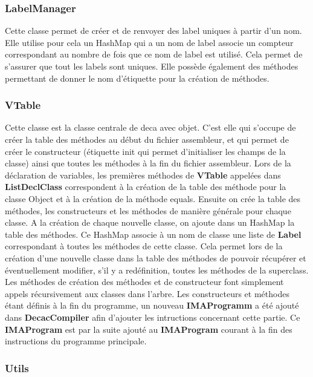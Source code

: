 \documentclass[12pt, a4paper, one side]{article}
\begin{document}
    \subsubsection{LabelManager}

    Cette classe permet de créer et de renvoyer des label uniques à partir d'un
    nom. Elle utilise pour cela un HashMap
    qui a un nom de label associe un compteur correspondant au nombre de fois
    que ce nom de label est utilisé. Cela
    permet de s'assurer que tout les labels sont uniques. Elle possède également
    des méthodes permettant de donner le nom d'étiquette pour la création
    de méthodes.

    \subsubsection{VTable}

    Cette classe est la classe centrale de deca avec objet. C'est elle qui
    s'occupe de créer la table des méthodes au début du fichier assembleur,
    et qui permet de créer le constructeur (étiquette init qui permet
    d'initialiser les champs de la classe) ainsi que toutes les méthodes
    à la fin du fichier assembleur.
    Lors de la déclaration de variables, les premières méthodes de
    \textbf{VTable} appelées dans \textbf{ListDeclClass} correspondent à
    la création de la table des méthode pour la classe Object et à la création
    de la méthode equals. Ensuite on crée la table des méthodes, les
    constructeurs et les méthodes de manière générale pour chaque classe.
    A la création de chaque nouvelle classe, on ajoute dans un HashMap la table
    des méthodes. Ce HashMap associe à un nom de classe une liste de
    \textbf{Label} correspondant à toutes les méthodes de cette classe. Cela
    permet lors de la création d'une nouvelle classe dans la table des méthodes
    de pouvoir récupérer et éventuellement modifier, s'il y a redéfinition, toutes
    les méthodes de la superclass. Les méthodes de création des méthodes et
    de constructeur font simplement appels récursivement aux classes dans
    l'arbre. Les constructeurs et méthodes étant définis à la fin du programme,
    un nouveau \textbf{IMAProgramm} a été ajouté dans \textbf{DecacCompiler}
    afin d'ajouter les intructions concernant cette partie. Ce
    \textbf{IMAProgram} est par la suite ajouté au \textbf{IMAProgram} courant
    à la fin des instructions du programme principale.


    \subsubsection{Utils}
\end{document}
